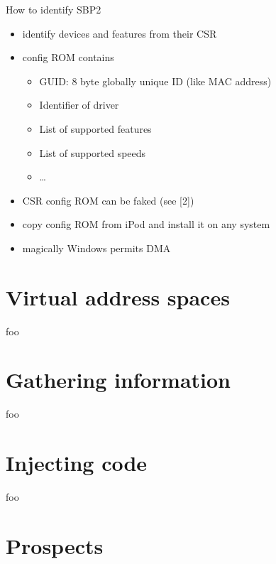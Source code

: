 \documentclass{beamer}
\newenvironment{itemizeframe}[1]
  {\begin{frame}{#1}\startitemizeframe}
  {\stopitemizeframe\end{frame}}
\newcommand\startitemizeframe{\begin{itemize}}
\newcommand\stopitemizeframe{\end{itemize}}
\begin{document}
		\begin{itemizeframe}{How to identify SBP2}
			\item identify devices and features from their CSR 
			\item config ROM contains
			\begin{itemize}
				\item GUID: 8 byte globally unique ID (like MAC address)
				\item Identifier of driver
				\item List of supported features
				\item List of supported speeds
				\item \ldots
			\end{itemize}
			\item<2-> CSR config ROM can be faked (see [2])
			\item<3-> copy config ROM from iPod and install it on any system
			\item<4-> magically Windows permits DMA
		\end{itemizeframe}

			




\section{Virtual address spaces}

	\begin{frame}
		foo
	\end{frame}

\section{Gathering information}

	\begin{frame}
		foo
	\end{frame}

\section{Injecting code}

	\begin{frame}
		foo
	\end{frame}


\section{Prospects}
\end{document}
